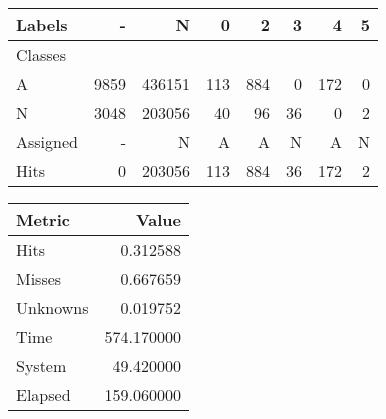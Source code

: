 \begin{tabular}{l|r|r|r|r|r|r|r}

Labels &     - &       N &    0 &    2 &   3 &    4 &  5 \\\hline
Classes  &       &         &      &      &     &      &    \\\hline
\hline
A        &  9859 &  436151 &  113 &  884 &   0 &  172 &  0 \\\hline
N        &  3048 &  203056 &   40 &   96 &  36 &    0 &  2 \\\hline
\hline
Assigned &     - &       N &    A &    A &   N &    A &  N \\\hline
Hits     &     0 &  203056 &  113 &  884 &  36 &  172 &  2 
\end{tabular}
\begin{tabular}{l|r}

Metric   &       Value \\\hline
\hline
Hits     &    0.312588 \\\hline
Misses   &    0.667659 \\\hline
Unknowns &    0.019752 \\\hline
Time     &  574.170000 \\\hline
System   &   49.420000 \\\hline
Elapsed  &  159.060000 
\end{tabular}
